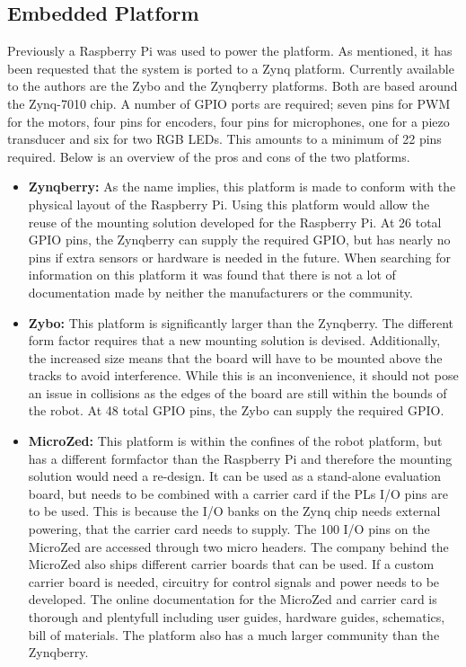 \subsection{Embedded Platform} %
\label{sub:embedded_platform}
Previously a Raspberry Pi was used to power the platform.
As mentioned, it has been requested that the system is ported to a Zynq platform.
Currently available to the authors are the Zybo and the Zynqberry platforms.
Both are based around the Zynq-7010 chip.
A number of GPIO ports are required; seven pins for PWM for the motors, four pins for encoders, four pins for microphones, one for a piezo transducer and six for two RGB LEDs.
This amounts to a minimum of 22 pins required.
Below is an overview of the pros and cons of the two platforms.
\begin{itemize}
	\item \textbf{Zynqberry:} As the name implies, this platform is made to conform with the physical layout of the Raspberry Pi.
	Using this platform would allow the reuse of the mounting solution developed for the Raspberry Pi.
	At 26 total GPIO pins, the Zynqberry can supply the required GPIO, but has nearly no pins if extra sensors or hardware is needed in the future.
	When searching for information on this platform it was found that there is not a lot of documentation made by neither the manufacturers or the community.
	\item \textbf{Zybo:} This platform is significantly larger than the Zynqberry.
	The different form factor requires that a new mounting solution is devised.
	Additionally, the increased size means that the board will have to be mounted above the tracks to avoid interference.
	While this is an inconvenience, it should not pose an issue in collisions as the edges of the board are still within the bounds of the robot.
	At 48 total GPIO pins, the Zybo can supply the required GPIO\@.
	\item \textbf{MicroZed:}
	This platform is within the confines of the robot platform, but has a different formfactor than the Raspberry Pi and therefore the mounting solution would need a re-design.
	It can be used as a stand-alone evaluation board, but needs to be combined with a carrier card if the PLs I/O pins are to be used.
	This is because the I/O banks on the Zynq chip needs external powering, that the carrier card needs to supply.
	The 100 I/O pins on the MicroZed are accessed through two micro headers.
	The company behind the MicroZed also ships different carrier boards that can be used.
	If a custom carrier board is needed, circuitry for control signals and power needs to be developed.
	The online documentation for the MicroZed and carrier card is thorough and plentyfull including user guides, hardware guides, schematics, bill of materials.
	The platform also has a much larger community than the Zynqberry.
\end{itemize}
